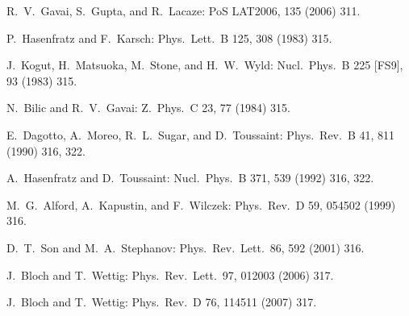 \begin{enumerate}[label={[\arabic*]}]
  \item R.~V.~Gavai, S.~Gupta, and R.~Lacaze: PoS LAT2006, 135 (2006) 311.
  \item P.~Hasenfratz and F.~Karsch: Phys.\ Lett.\ B 125, 308 (1983) 315.
  \item J.~Kogut, H.~Matsuoka, M.~Stone, and H.~W.~Wyld: Nucl.\ Phys.\ B 225
        [FS9], 93 (1983) 315.
  \item N.~Bilic and R.~V.~Gavai: Z.\ Phys.\ C 23, 77 (1984) 315.
  \item E.~Dagotto, A.~Moreo, R.~L.~Sugar, and D.~Toussaint: Phys.\ Rev.\ B 41,
        811 (1990) 316, 322.
  \item A.~Hasenfratz and D.~Toussaint: Nucl.\ Phys.\ B 371, 539 (1992)
        316, 322.
  \item M.~G.~Alford, A.~Kapustin, and F.~Wilczek: Phys.\ Rev.\ D 59, 054502
        (1999) 316.
  \item D.~T.~Son and M.~A.~Stephanov: Phys.\ Rev.\ Lett.\ 86, 592 (2001) 316.
  \item J.~Bloch and T.~Wettig: Phys.\ Rev.\ Lett.\ 97, 012003 (2006) 317.
  \item J.~Bloch and T.~Wettig: Phys.\ Rev.\ D 76, 114511 (2007) 317.
\end{enumerate}
